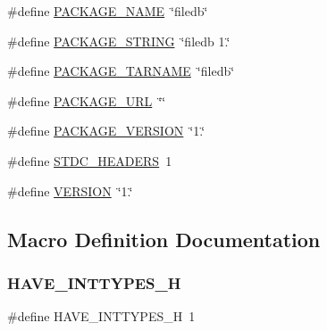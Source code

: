 \begin{DoxyCompactItemize}
\item 
\#define \mbox{\hyperlink{adat-devel_2build_2other__libs_2filedb_2src_2filedb__config__internal_8h_a1c0439e4355794c09b64274849eb0279}{P\+A\+C\+K\+A\+G\+E\+\_\+\+N\+A\+ME}}~\char`\"{}filedb\char`\"{}
\item 
\#define \mbox{\hyperlink{adat-devel_2build_2other__libs_2filedb_2src_2filedb__config__internal_8h_ac73e6f903c16eca7710f92e36e1c6fbf}{P\+A\+C\+K\+A\+G\+E\+\_\+\+S\+T\+R\+I\+NG}}~\char`\"{}filedb 1.\char`\"{}
\item 
\#define \mbox{\hyperlink{adat-devel_2build_2other__libs_2filedb_2src_2filedb__config__internal_8h_af415af6bfede0e8d5453708afe68651c}{P\+A\+C\+K\+A\+G\+E\+\_\+\+T\+A\+R\+N\+A\+ME}}~\char`\"{}filedb\char`\"{}
\item 
\#define \mbox{\hyperlink{adat-devel_2build_2other__libs_2filedb_2src_2filedb__config__internal_8h_a5c93853116d5a50307b6744f147840aa}{P\+A\+C\+K\+A\+G\+E\+\_\+\+U\+RL}}~\char`\"{}\char`\"{}
\item 
\#define \mbox{\hyperlink{adat-devel_2build_2other__libs_2filedb_2src_2filedb__config__internal_8h_aa326a05d5e30f9e9a4bb0b4469d5d0c0}{P\+A\+C\+K\+A\+G\+E\+\_\+\+V\+E\+R\+S\+I\+ON}}~\char`\"{}1.\char`\"{}
\item 
\#define \mbox{\hyperlink{adat-devel_2build_2other__libs_2filedb_2src_2filedb__config__internal_8h_a550e5c272cc3cf3814651721167dcd23}{S\+T\+D\+C\+\_\+\+H\+E\+A\+D\+E\+RS}}~1
\item 
\#define \mbox{\hyperlink{adat-devel_2build_2other__libs_2filedb_2src_2filedb__config__internal_8h_a1c6d5de492ac61ad29aec7aa9a436bbf}{V\+E\+R\+S\+I\+ON}}~\char`\"{}1.\char`\"{}
\end{DoxyCompactItemize}


\subsection{Macro Definition Documentation}
\mbox{\label{adat-devel_2build_2other__libs_2filedb_2src_2filedb__config__internal_8h_ab90a030ff2790ebdc176660a6dd2a478}} 
\subsubsection{\texorpdfstring{HAVE\_INTTYPES\_H}{HAVE\_INTTYPES\_H}}
{\footnotesize\ttfamily \#define H\+A\+V\+E\+\_\+\+I\+N\+T\+T\+Y\+P\+E\+S\+\_\+H~1}

